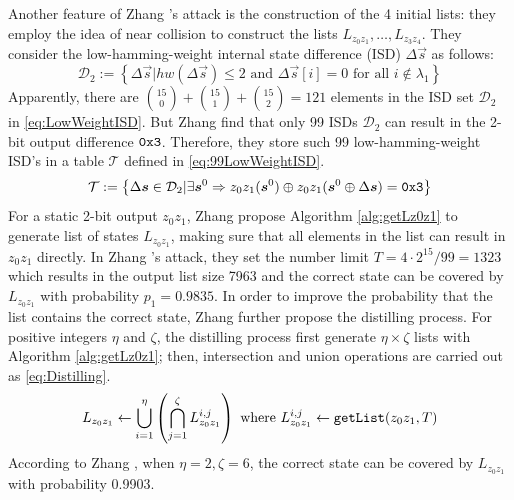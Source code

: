 Another feature of Zhang \etal's attack is the construction of the 4 initial lists: they employ the idea of near collision to construct the lists $L_{z_0z_1},\ldots, L_{z_3z_4}$.
They consider the low-hamming-weight internal state difference (ISD) $\Delta \vec{s}$ as follows:
\begin{equation}\label{eq:LowWeightISD}
  \mathcal{D}_2:=\left\{\Delta\vec{s}| hw(\Delta\vec{s})\leq 2 \text{ and } \Delta\vec{s}[i]=0  \text{ for all } i\notin\lambda_1 \right\}
\end{equation}
Apparently, there are $\binom{15}{0}+\binom{15}{1}+\binom{15}{2}=121$ elements in the ISD set $\mathcal{D}_2$ in \eqref{eq:LowWeightISD}.
But Zhang \etal find that only 99 ISDs $\mathcal{D}_2$ can result in the 2-bit output difference ${\tt 0x3}$.
Therefore, they store such 99 low-hamming-weight ISD's in a table $\mathcal{T}$ defined in \eqref{eq:99LowWeightISD}.
\begin{equation}\label{eq:99LowWeightISD}
  \mathcal{T}:=\left\{\Delta\vec{s}\in \mathcal{D}_2|
  \exists \vec{s}^0 \Rightarrow z_0z_1(\vec{s}^0)\oplus z_0z_1(\vec{s}^0\oplus \Delta\vec{s}) ={\tt 0x3}
  \right\}
\end{equation}
For a static 2-bit output $z_0z_1$,
Zhang \etal propose Algorithm \ref{alg:getLz0z1} to generate list of states $L_{z_0z_1}$, making sure that all elements in the list can result in  $z_0z_1$ directly.
In Zhang \etal's attack, they set the number limit $T=4\cdot 2^{15}/99=1323$ which results in the output list size 7963 and the correct state can be covered by $L_{z_0z_1}$ with probability $p_1=0.9835$.
In order to improve the probability that the list contains the correct state, Zhang \etal further propose the distilling process.
For positive integers $\eta$ and $\zeta$, the distilling process first generate $\eta\times \zeta$ lists with Algorithm \ref{alg:getLz0z1}; then, intersection and union operations are carried out as \eqref{eq:Distilling}.
\begin{equation}\label{eq:Distilling}
 L_{z_0z_1} \leftarrow
  \bigcup_{i=1}^{\eta}\left(\bigcap_{j=1}^\zeta L^{i,j}_{z_0z_1}\right)
  \text{ where }
  L^{i,j}_{z_0z_1}\leftarrow
  {\tt getList}(z_0z_1, T)
\end{equation}
According to Zhang \etal, when $\eta=2, \zeta=6$, the correct state can be covered by $L_{z_0z_1}$ with probability 0.9903.

